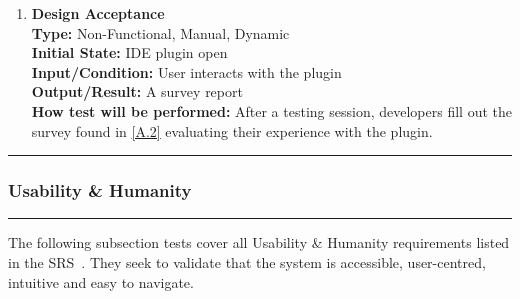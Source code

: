 \documentclass[12pt, titlepage]{article}
\newcommand{\colorrule}{\textcolor{BlueViolet}{\rule{\linewidth}{2pt}}}
\begin{document}
\begin{enumerate}[label={\bf \textcolor{Maroon}{test-LF-\arabic*}},
    wide=0pt, font=\itshape]
  \item \textbf{Design Acceptance} \\[2mm]
    \textbf{Type:} Non-Functional, Manual, Dynamic \\
    \textbf{Initial State:} IDE plugin open \\
    \textbf{Input/Condition:} User interacts with the plugin \\
    \textbf{Output/Result:} A survey report \\[2mm]
    \textbf{How test will be performed:} After a testing session,
    developers fill out the survey found in \ref{A.2} evaluating
    their experience with the plugin.
\end{enumerate}

\noindent
\colorrule

\subsubsection{Usability \& Humanity}

\colorrule

\medskip

\noindent
The following subsection tests cover all Usability \& Humanity
requirements listed in the SRS~\cite{SRS}. They seek to validate that
the system is accessible, user-centred, intuitive and easy to navigate.
\end{document}
